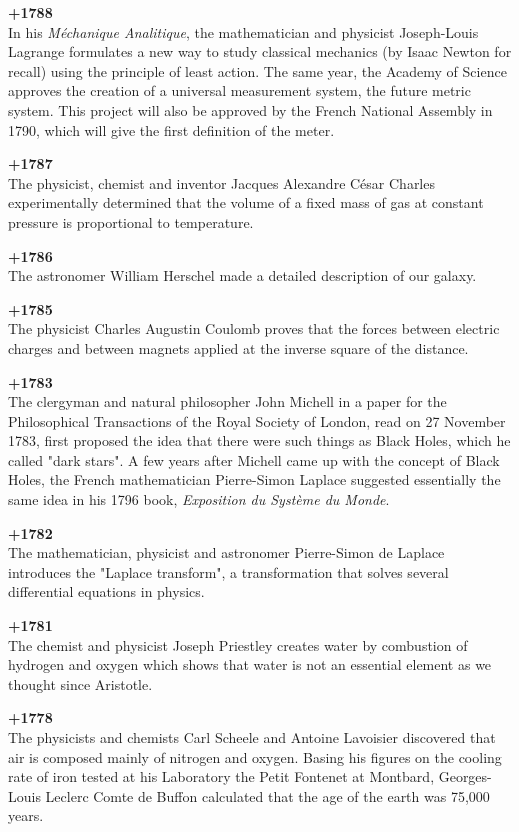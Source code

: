 \textbf{+1788}\\
In his \textit{Méchanique Analitique}, the mathematician and physicist Joseph-Louis Lagrange formulates a new way to study classical mechanics (by Isaac Newton for recall) using the principle of least action. The same year, the Academy of Science approves the creation of a universal measurement system, the future metric system. This project will also be approved by the French National Assembly in 1790, which will give the first definition of the meter.

\textbf{+1787}\\
The physicist, chemist and inventor Jacques Alexandre César Charles experimentally determined that the volume of a fixed mass of gas at constant pressure is proportional to temperature.

\textbf{+1786}\\
The astronomer William Herschel made a detailed description of our galaxy.

\textbf{+1785}\\
The physicist Charles Augustin Coulomb proves that the forces between electric charges and between magnets applied at the inverse square of the distance.

\textbf{+1783}\\
The clergyman and natural philosopher John Michell in a paper for the Philosophical Transactions of the Royal Society of London, read on 27 November 1783, first proposed the idea that there were such things as Black Holes, which he called "dark stars". A few years after Michell came up with the concept of Black Holes, the French mathematician Pierre-Simon Laplace suggested essentially the same idea in his 1796 book, \textit{Exposition du Système du Monde}. 

\textbf{+1782}\\
The mathematician, physicist and astronomer Pierre-Simon de Laplace introduces the "Laplace transform", a transformation that solves several differential equations in physics.

\textbf{+1781}\\
The chemist and physicist Joseph Priestley creates water by combustion of hydrogen and oxygen which shows that water is not an essential element as we thought since Aristotle.

\textbf{+1778}\\
The physicists and chemists Carl Scheele and Antoine Lavoisier discovered that air is composed mainly of nitrogen and oxygen. Basing his figures on the cooling rate of iron tested at his Laboratory the Petit Fontenet at Montbard, Georges-Louis Leclerc Comte de Buffon calculated that the age of the earth was 75,000 years. 

